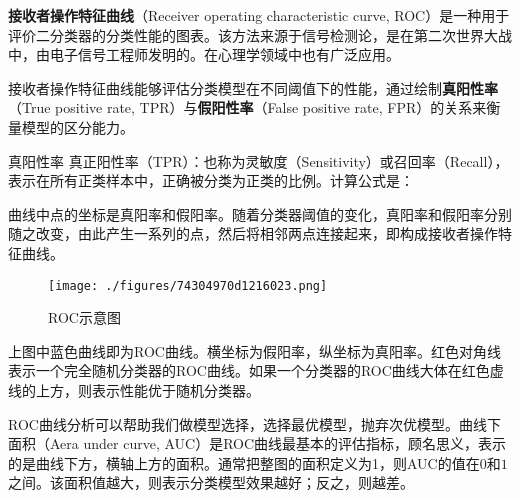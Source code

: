 

\textbf{接收者操作特征曲线}（Receiver operating characteristic curve, ROC）是一种用于评价二分类器的分类性能的图表。该方法来源于信号检测论，是在第二次世界大战中，由电子信号工程师发明的。在心理学领域中也有广泛应用。

接收者操作特征曲线能够评估分类模型在不同阈值下的性能，通过绘制\textbf{真阳性率}（True positive rate, TPR）与\textbf{假阳性率}（False positive rate, FPR）的关系来衡量模型的区分能力。

\begin{definition}{真阳性率}
真正阳性率（TPR）：也称为灵敏度（Sensitivity）或召回率（Recall），表示在所有正类样本中，正确被分类为正类的比例。计算公式是：
\end{definition}

曲线中点的坐标是真阳率和假阳率。随着分类器阈值的变化，真阳率和假阳率分别随之改变，由此产生一系列的点，然后将相邻两点连接起来，即构成接收者操作特征曲线。

\begin{figure}[ht]
\centering
\texttt{[image: ./figures/74304970d1216023.png]}
\caption{ROC示意图} \label{fig_ROC_1}
\end{figure}
上图中蓝色曲线即为ROC曲线。横坐标为假阳率，纵坐标为真阳率。红色对角线表示一个完全随机分类器的ROC曲线。如果一个分类器的ROC曲线大体在红色虚线的上方，则表示性能优于随机分类器。

ROC曲线分析可以帮助我们做模型选择，选择最优模型，抛弃次优模型。曲线下面积（Aera under curve, AUC）是ROC曲线最基本的评估指标，顾名思义，表示的是曲线下方，横轴上方的面积。通常把整图的面积定义为1，则AUC的值在$0$和$1$之间。该面积值越大，则表示分类模型效果越好；反之，则越差。
